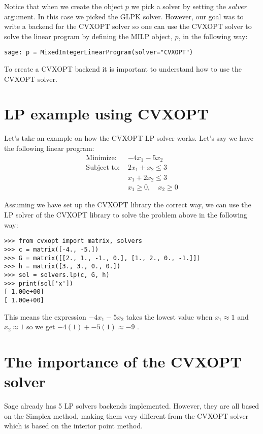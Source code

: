 Notice that when we create the object $p$ we pick a solver by setting the $solver$ argument. In this case we picked the GLPK solver. However, our goal was to write a backend for the CVXOPT solver so one can use the CVXOPT solver to solve the linear program by defining the MILP object, $p$, in the following way:
\begin{verbatim}
sage: p = MixedIntegerLinearProgram(solver="CVXOPT")
\end{verbatim}

To create a CVXOPT backend it is important to understand how to use the CVXOPT solver.



\section{LP example using CVXOPT}
Let's take an example on how the CVXOPT LP solver works. Let's say we have the following linear program:
\begin{align}
\text{Minimize: }  &-4x_1 - 5x_2\\
\text{Subject to: }  &2x_1 + x_2 \leq 3 \\
&x_1 + 2x_2 \leq 3 \\
&x_1 \geq 0, \quad x_2 \geq 0 
\end{align}



Assuming we have set up the CVXOPT library the correct way, we can use the LP solver of the CVXOPT library to solve the problem above in the following way:

\begin{verbatim}
>>> from cvxopt import matrix, solvers
>>> c = matrix([-4., -5.])
>>> G = matrix([[2., 1., -1., 0.], [1., 2., 0., -1.]])
>>> h = matrix([3., 3., 0., 0.])
>>> sol = solvers.lp(c, G, h)
>>> print(sol['x'])
[ 1.00e+00]
[ 1.00e+00]
\end{verbatim} 

This means the expression $-4x_1 -5x_2$ takes the lowest value when $x_1 \approx 1$ and $x_2 \approx 1$ so we get $-4(1) + -5(1) \approx -9$ \cite{cvxoptuser}.


\section{The importance of the CVXOPT solver}
Sage already has 5 LP solvers backends implemented. However, they are all based on the Simplex method, making them very different from the CVXOPT solver which is based on the interior point method.


